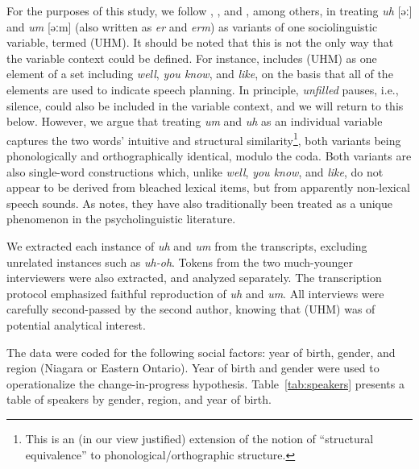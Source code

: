\documentclass[11pt]{article}
\begin{document}
For the purposes of this study, we follow \textcite{fruehwald2016},
\textcite{wielingetal2016}, and \textcite{tottie2016}, among others, in treating
\emph{uh} [əː] and \emph{um} [əːm] (also written as \emph{er} and \emph{erm}) as
variants of one sociolinguistic variable, termed (UHM).
It should be noted that this is not the only way that the variable context could
be defined.
For instance, \textcite{tottie2018} includes (UHM) as one element of a set
including \emph{well}, \emph{you know}, and \emph{like}, on the basis that all
of the elements are used to indicate speech planning.
In principle, \emph{unfilled} pauses, i.e., silence, could also be included in
the variable context, and we will return to this below.
However, we argue that treating \emph{um} and \emph{uh} as an individual
variable captures the two words' intuitive and structural similarity\footnote{%
    This is an (in our view justified) extension of the notion of ``structural
    equivalence'' \parencite{pichler2010, tagliamontedenis2010} to
    phonological/orthographic structure.
}, both variants being phonologically and orthographically identical, modulo
the coda.
Both variants are also single-word constructions which, unlike \emph{well},
\emph{you know}, and \emph{like}, do not appear to be derived from bleached
lexical items, but from apparently non-lexical speech sounds.
As \textcite{fruehwald2016} notes, they have also traditionally been treated as
a unique phenomenon in the psycholinguistic literature.


We extracted each instance of \emph{uh} and \emph{um} from the transcripts,
excluding unrelated instances such as \emph{uh-oh}.
Tokens from the two much-younger interviewers were also extracted, and analyzed
separately.
The transcription protocol emphasized faithful reproduction of \emph{uh} and
\emph{um}.
All interviews were carefully second-passed by the second author, knowing that
(UHM) was of potential analytical interest.

The data were coded for the following social factors:
year of birth, gender, and region (Niagara or Eastern Ontario).
Year of birth and gender were used to operationalize the change-in-progress
hypothesis.
Table~\ref{tab:speakers} presents a table of speakers by gender, region, and
year of birth.
\end{document}
